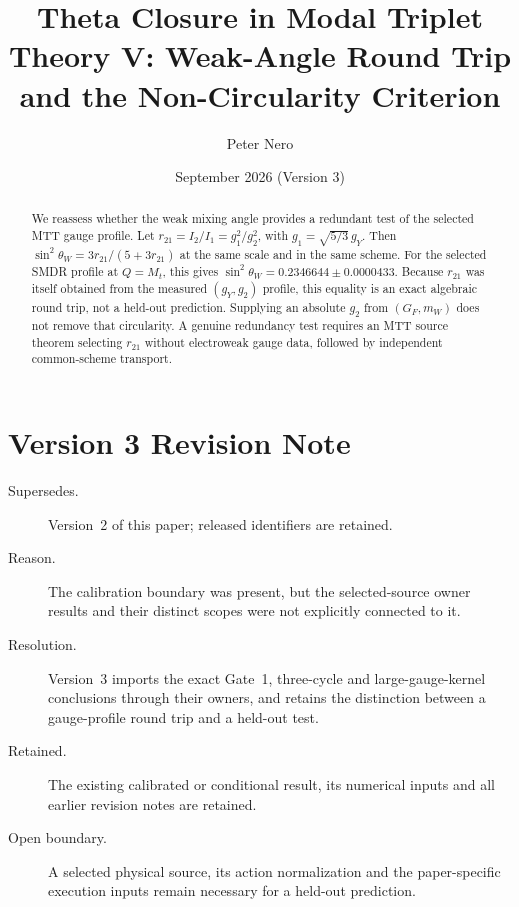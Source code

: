 \documentclass[11pt]{article}
\title{Theta Closure in Modal Triplet Theory V:
Weak-Angle Round Trip and the Non-Circularity Criterion}
\author{Peter Nero}
\date{September 2026 (Version 3)}
\begin{document}
\maketitle

\begin{abstract}
We reassess whether the weak mixing angle provides a redundant test of the
selected MTT gauge profile. Let
$r_{21}=I_2/I_1=g_1^2/g_2^2$, with $g_1=\sqrt{5/3}\,g_Y$. Then
$\sin^2\theta_W=3r_{21}/(5+3r_{21})$ at the same scale and in the same scheme.
For the selected SMDR profile at $Q=M_t$, this gives
$\sin^2\theta_W=0.2346644\pm0.0000433$. Because $r_{21}$ was itself obtained
from the measured $(g_Y,g_2)$ profile, this equality is an exact algebraic
round trip, not a held-out prediction. Supplying an absolute $g_2$ from
$(G_F,m_W)$ does not remove that circularity. A genuine redundancy test
requires an MTT source theorem selecting $r_{21}$ without electroweak gauge
data, followed by independent common-scheme transport.
\end{abstract}

\section*{Version 3 Revision Note}
\label{sec:revision-v3}
\begin{description}
\item[Supersedes.] Version~2 of this paper; released identifiers are retained.
\item[Reason.] The calibration boundary was present, but the selected-source
owner results and their distinct scopes were not explicitly connected to it.
\item[Resolution.] Version~3 imports the exact Gate~1, three-cycle and
large-gauge-kernel conclusions through their owners, and retains the distinction between a gauge-profile round trip and a held-out test.
\item[Retained.] The existing calibrated or conditional result, its numerical
inputs and all earlier revision notes are retained.
\item[Open boundary.] A selected physical source, its action normalization and
the paper-specific execution inputs remain necessary for a held-out prediction.
\end{description}
\end{document}
